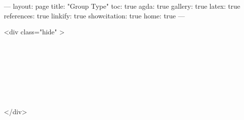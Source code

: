 ---
layout: page
title: "Group Type"
toc: true
agda: true
gallery: true
latex: true
references: true
linkify: true
showcitation: true
home: true
---

<div class="hide" >
\begin{code}%
\>[0]\AgdaSymbol{\{-\#}\AgdaSpace{}%
\AgdaSpace{}%
\AgdaSpace{}%
\AgdaSymbol{\#-\}}\<%
\\
\>[0]\AgdaSpace{}%
\AgdaSpace{}%
\<%
\\
\>[0]\AgdaSpace{}%
\AgdaSpace{}%
\<%
\\
%
\\[\AgdaEmptyExtraSkip]%
\>[0]\AgdaSpace{}%
\AgdaSpace{}%
\<%
\\
\>[0]\AgdaSpace{}%
\AgdaSpace{}%
\<%
\\
\>[0]\AgdaSpace{}%
\AgdaSpace{}%
\<%
\end{code}
</div>

